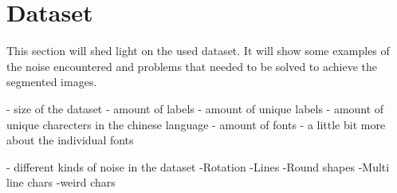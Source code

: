 \section{Dataset} %
\label{sec:dataset}

This section will shed light on the used dataset. It will show some examples of the noise encountered and problems that needed to be solved to achieve the segmented images.

- size of the dataset
- amount of labels
- amount of unique labels
- amount of unique charecters in the chinese language
- amount of fonts
- a little bit more about the individual fonts

- different kinds of noise in the dataset
	-Rotation
	-Lines
	-Round shapes
	-Multi line chars
	-weird chars